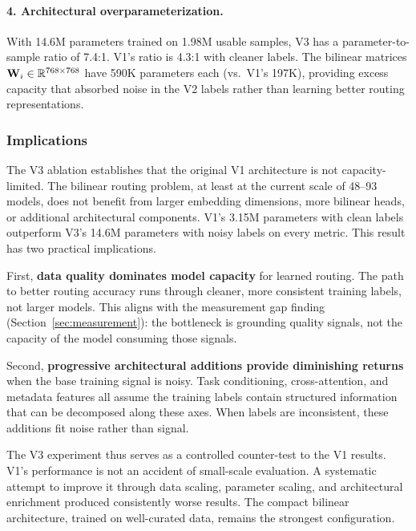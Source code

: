 \paragraph{4. Architectural overparameterization.} With 14.6M parameters trained on 1.98M usable samples, V3 has a parameter-to-sample ratio of 7.4:1. V1's ratio is 4.3:1 with cleaner labels. The bilinear matrices $\mathbf{W}_i \in \mathbb{R}^{768 \times 768}$ have 590K parameters each (vs.\ V1's 197K), providing excess capacity that absorbed noise in the V2 labels rather than learning better routing representations.

\subsubsection{Implications}

The V3 ablation establishes that the original V1 architecture is not capacity-limited. The bilinear routing problem, at least at the current scale of 48--93 models, does not benefit from larger embedding dimensions, more bilinear heads, or additional architectural components. V1's 3.15M parameters with clean labels outperform V3's 14.6M parameters with noisy labels on every metric. This result has two practical implications.

First, \textbf{data quality dominates model capacity} for learned routing. The path to better routing accuracy runs through cleaner, more consistent training labels, not larger models. This aligns with the measurement gap finding (Section~\ref{sec:measurement}): the bottleneck is grounding quality signals, not the capacity of the model consuming those signals.

Second, \textbf{progressive architectural additions provide diminishing returns} when the base training signal is noisy. Task conditioning, cross-attention, and metadata features all assume the training labels contain structured information that can be decomposed along these axes. When labels are inconsistent, these additions fit noise rather than signal.

The V3 experiment thus serves as a controlled counter-test to the V1 results. V1's performance is not an accident of small-scale evaluation. A systematic attempt to improve it through data scaling, parameter scaling, and architectural enrichment produced consistently worse results. The compact bilinear architecture, trained on well-curated data, remains the strongest configuration.
